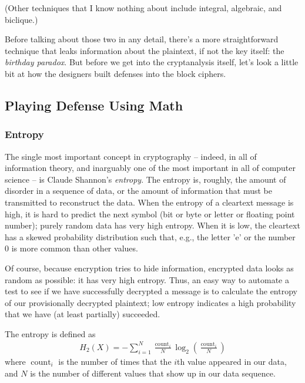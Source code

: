 \aonolook{}
(Other techniques that I know nothing about include integral,
algebraic, and biclique.)

Before talking about those two in any detail, there's a more
straightforward technique that leaks information about the plaintext,
if not the key itself: the \emph{birthday paradox}.  But before we get
into the cryptanalysis itself, let's look a little bit at how the
designers built defenses into the block ciphers.

\subsection{Playing Defense Using Math}
\label{sec:defense}

\subsubsection{Entropy}

The single most important concept in cryptography -- indeed, in all of
information theory, and inarguably one of the most important in all of
computer science -- is Claude Shannon's \emph{entropy}.  The entropy is,
roughly, the amount of disorder in a sequence of data, or the amount
of information that must be transmitted to reconstruct the data.  When
the entropy of a cleartext message is high, it is hard to predict the
next symbol (bit or byte or letter or floating point number); purely
random data has very high entropy.  When it is low, the cleartext has
a skewed probability distribution such that, e.g., the letter 'e' or
the number 0 is more common than other values.

Of course, because encryption tries to hide information, encrypted
data looks as random as possible: it has very high entropy.  Thus, an
easy way to automate a test to see if we have successfully decrypted a
message is to calculate the entropy of our provisionally decrypted
plaintext; low entropy indicates a high probability that we have (at
least partially) succeeded.

The entropy is defined as
\begin{align}
H_{2}(X)=-\sum_{i=1}^{N} \frac{\operatorname{count}_{i}}{N} \log
_{2}\left(\frac{\operatorname{count}_{i}}{N}\right)
\end{align}
where $\operatorname{count}_i$ is the number of times that the $i$th
value appeared in our data, and $N$ is the number of different values
that show up in our data sequence.

